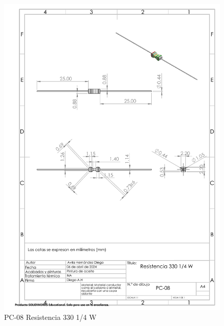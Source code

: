     \begin{figure}[H]
        \centering
        \includegraphics[scale=0.4]{3/Img/resistenciaDibujo.pdf}
        \caption{PC-08 Resistencia 330 1/4 W} 
        \label{fig:resistenciaDibujo}
    \end{figure}
